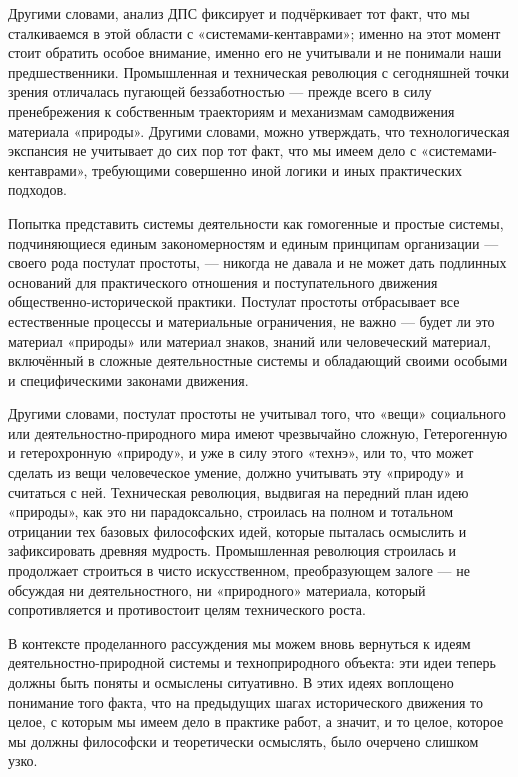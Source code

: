 \documentclass[11pt,a4paper]{article}
\begin{document}
Другими словами, анализ ДПС фиксирует и подчёркивает тот факт, что мы
сталкиваемся в этой области с «системами-кентаврами»; именно на этот момент
стоит обратить особое внимание, именно его не учитывали и не понимали наши
предшественники. Промышленная и техническая революция с сегодняшней точки
зрения отличалась пугающей беззаботностью — прежде всего в силу пренебрежения
к собственным траекториям и механизмам самодвижения материала «природы».
Другими словами, можно утверждать, что технологическая экспансия не учитывает
до сих пор тот факт, что мы имеем дело с «системами-кентаврами», требующими
совершенно иной логики и иных практических подходов.

Попытка представить системы деятельности как гомогенные и простые системы,
подчиняющиеся единым закономерностям и единым принципам организации — своего
рода постулат простоты, — никогда не давала и не может дать подлинных
оснований для практического отношения и поступательного движения
общественно-исторической практики. Постулат простоты отбрасывает все
естественные процессы и материальные ограничения, не важно — будет ли это
материал «природы» или материал знаков, знаний или человеческий материал,
включённый в сложные деятельностные системы и обладающий своими особыми и
специфическими законами движения. 

Другими словами, постулат простоты не учитывал того, что «вещи» социального
или деятельностно-природного мира имеют чрезвычайно сложную, Гетерогенную и
гетерохронную «природу», и уже в силу этого «технэ», или то, что может сделать
из вещи человеческое умение, должно учитывать эту «природу» и считаться с ней.
Техническая революция, выдвигая на передний план идею «природы», как это ни
парадоксально, строилась на полном и тотальном отрицании тех базовых
философских идей, которые пыталась осмыслить и зафиксировать древняя мудрость.
Промышленная революция строилась и продолжает строиться в чисто искусственном,
преобразующем залоге — не обсуждая ни деятельностного, ни «природного»
материала, который сопротивляется и противостоит целям технического роста.

В контексте проделанного рассуждения мы можем вновь вернуться к идеям
деятельност\-но-природной системы и техноприродного объекта: эти идеи теперь
должны быть поняты и осмыслены ситуативно. В этих идеях воплощено понимание
того факта, что на предыдущих шагах исторического движения то целое, с которым
мы имеем дело в практике работ, а значит, и то целое, которое мы должны
философски и теоретически осмыслять, было очерчено слишком узко. 
\end{document}
